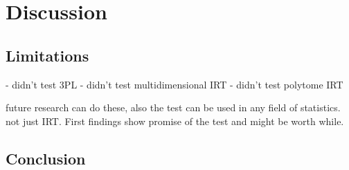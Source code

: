 \documentclass[Royal,sageapa,times,doublespace]{sagej}
\begin{document}
\section{Discussion}

\subsection{Limitations}

 - didn't test 3PL
- didn't test multidimensional IRT
- didn't test polytome IRT

future research can do these, also the test can be used in any field of statistics. not just IRT. First findings show promise of the test and might be worth while. 


\subsection{Conclusion}

\newpage

\nocite{*}


\end{document}
